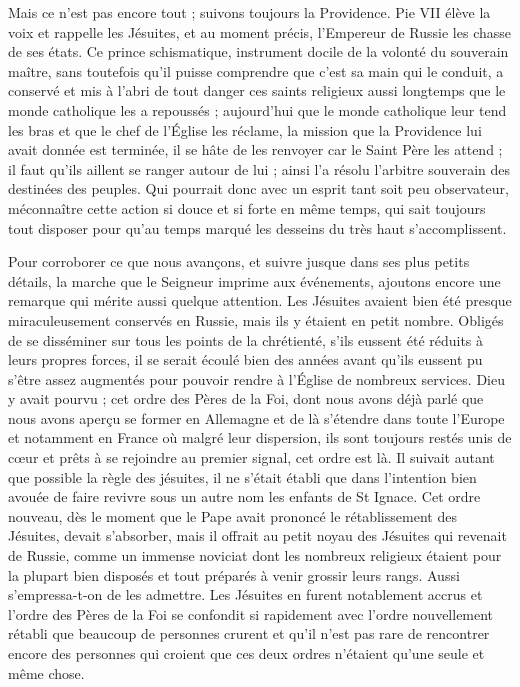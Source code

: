 Mais ce n'est pas encore tout ; suivons toujours la Providence. Pie VII élève la voix et rappelle les Jésuites, et au moment précis, l'Empereur de Russie les chasse de ses états. Ce prince schismatique, instrument docile de la volonté du souverain maître, sans toutefois qu'il puisse comprendre que c'est sa main qui le conduit, a conservé et mis à l'abri de tout danger ces saints religieux aussi longtemps que le monde catholique les a repoussés ; aujourd'hui que le monde catholique leur tend les bras et que le chef de l'Église les réclame, la mission que la Providence lui avait donnée est terminée, il se hâte de les renvoyer car le Saint Père les attend ; il faut qu'ils aillent se ranger autour de lui ; ainsi l’a résolu l’arbitre souverain des destinées des peuples. Qui pourrait donc avec un esprit tant soit peu observateur, méconnaître cette action si douce et si forte en même temps, qui sait toujours tout disposer pour qu’au temps marqué les desseins du très haut s'accomplissent.

Pour corroborer ce que nous avançons, et suivre jusque dans ses plus petits détails, la marche que le Seigneur
imprime aux événements, ajoutons encore une remarque qui mérite aussi quelque attention. Les Jésuites avaient bien été presque miraculeusement conservés en Russie, mais ils y étaient en petit nombre. Obligés de se disséminer sur tous les points de la chrétienté, s'ils eussent été réduits à leurs propres forces, il se serait écoulé bien des années avant qu'ils eussent pu s'être assez augmentés pour pouvoir rendre à l'Église de nombreux services. Dieu y avait pourvu ; cet ordre des Pères de la Foi, dont nous avons déjà parlé que nous avons aperçu se former en Allemagne et de là s'étendre dans toute l'Europe et notamment en France où malgré leur dispersion, ils sont toujours restés unis de cœur et prêts à se rejoindre au premier signal, cet ordre est là. Il suivait autant que possible la règle des jésuites, il ne s'était établi que dans l'intention bien avouée de faire revivre sous un autre nom les enfants de St Ignace. Cet ordre nouveau, dès le moment que le Pape avait prononcé le rétablissement des Jésuites, devait s’absorber, mais il offrait au petit noyau des Jésuites qui revenait de Russie, comme un immense noviciat dont les nombreux religieux étaient pour la plupart bien disposés et tout préparés à venir grossir leurs rangs. Aussi s'empressa-t-on de les admettre. Les Jésuites en furent notablement accrus et l'ordre des Pères de la Foi se confondit si rapidement avec l'ordre nouvellement rétabli que beaucoup de personnes crurent et qu'il n'est pas rare de rencontrer encore des personnes qui croient que ces deux ordres n'étaient qu'une seule et même chose.

